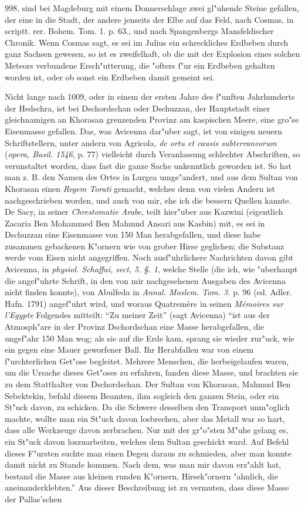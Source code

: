 \documentclass[a4paper, 11pt, oneside, polutonikogreek, german]{article}
\begin{document}
998, sind bei Magdeburg mit einem Donnerschlage zwei gl"uhende Steine gefallen, der eine in die Stadt, der andere jenseits der Elbe auf das Feld, nach Cosmas, in scriptt. rer. Bohem. Tom. 1. p. 63., und nach Spangenbergs Mansfeldischer Chronik. Wenn Cosmas sagt, es sei im Julius ein schreckliches Erdbeben durch ganz Sachsen gewesen, so ist es zweifelhaft, ob die mit der Explosion eines solchen Meteors verbundene Ersch"utterung, die "ofters f"ur ein Erdbeben gehalten worden ist, oder ob sonst ein Erdbeben damit gemeint sei.

Nicht lange nach 1009, oder in einem der ersten Jahre des f"unften Jahrhunderts der Hedschra, ist bei Dschordschan oder Dschuzzan, der Hauptstadt einer gleichnamigen an Khorasan grenzenden Provinz am kaspischen Meere, eine gro"se Eisenmasse gefallen. Das, was Avicenna dar"uber sagt, ist von einigen neuern Schriftstellern, unter andern von Agricola, \emph{de ortu et causis subterraneorum} (\emph{opera, Basil. 1546}, p. 77) vielleicht durch Veranlassung schlechter Abschriften, so verunstaltet worden, dass fast die ganze Sache unkenntlich geworden ist. So hat man z. B. den Namen des Ortes in Lurgea umge"andert, und aus dem Sultan von Khorasan einen \emph{Regem Torati} gemacht, welches denn von vielen Andern ist nachgeschrieben worden, und auch von mir, ehe ich die bessern Quellen kannte. De Sacy, in seiner \emph{Chrestomatie Arabe}, teilt hier"uber aus Kazwini (eigentlich Zacaria Ben Mohammed Ben Mahmud Ansari aus Kasbin) mit, es sei in Dschuzzan eine Eisenmasse von 150 Man herabgefallen, und diese habe zusammen gebackenen K"ornern wie von grober Hirse geglichen; die Substanz werde vom Eisen nicht angegriffen. Noch ausf"uhrlichere Nachrichten davon gibt Avicenna, in \emph{physiol. Schaffai, sect, 5. §. 1}, welche Stelle (die ich, wie "uberhaupt die angef"uhrte Schrift, in den von mir nachgesehenen Ausgaben des Avicenna nicht finden konnte), von Abulfeda in \emph{Annal. Moslem. Tom. 3.} p. 96 (ed. Adler. Hafn. 1791) angef"uhrt wird, und woraus Quatremère in seinen \emph{Mémoires sur l'Egypte} Folgendes mitteilt: "`Zu meiner Zeit"' (sagt Avicenna) "`ist aus der Atmosph"are in der Provinz Dschordschan eine Masse herabgefallen, die ungef"ahr 150 Man wog; als sie auf die Erde kam, sprang sie wieder zur"uck, wie ein gegen eine Mauer geworfener Ball. Ihr Herabfallen war von einem f"urchterlichen Get"ose begleitet. Mehrere Menschen, die herbeigelaufen waren, um die Ursache dieses Get"oses zu erfahren, fanden diese Masse, und brachten sie zu dem Statthalter von Dschordschan. Der Sultan von Khorasan, Mahmud Ben Sebektekin, befahl diesem Beamten, ihm sogleich den ganzen Stein, oder ein St"uck davon, zu schicken. Da die Schwere desselben den Transport unm"oglich machte, wollte man ein St"uck davon losbrechen, aber das Metall war so hart, dass alle Werkzeuge davon zerbrachen. Nur mit der gr"o"sten M"uhe gelang es, ein St"uck davon loszuarbeiten, welches dem Sultan geschickt ward. Auf Befehl dieses F"ursten suchte man einen Degen daraus zu schmieden, aber man konnte damit nicht zu Stande kommen. Nach dem, was man mir davon erz"ahlt hat, bestand die Masse aus kleinen runden K"ornern, Hirsek"ornern "ahnlich, die aneinanderklebten."' Aus dieser Beschreibung ist zu vermuten, dass diese Masse der Pallas'schen 
\end{document}

